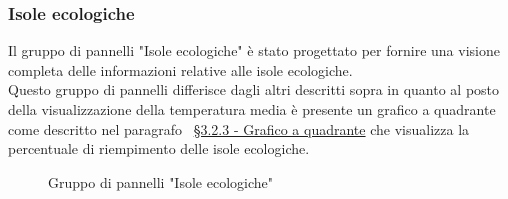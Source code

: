 \subsubsection{Isole ecologiche}
Il gruppo di pannelli "Isole ecologiche" è stato progettato per fornire una visione completa delle informazioni relative alle isole ecologiche. \\
Questo gruppo di pannelli differisce dagli altri descritti sopra in quanto al posto della visualizzazione della temperatura media è presente un grafico a quadrante come descritto nel paragrafo ~\hyperlink{par:grafico_quadrante}{\S 3.2.3 - Grafico a quadrante} che visualizza la percentuale di riempimento delle isole ecologiche. \\
\begin{figure}[H]
    \centering
    \caption{Gruppo di pannelli "Isole ecologiche"}
    \label{fig:my_label}
\end{figure}


